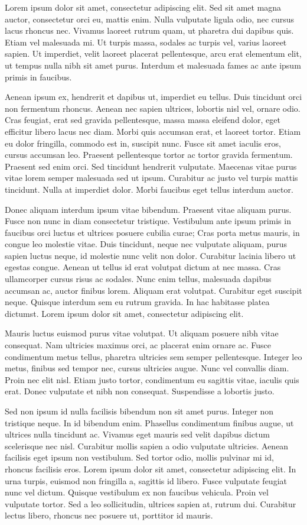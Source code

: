 Lorem ipsum dolor sit amet, consectetur adipiscing elit. Sed sit amet magna auctor, consectetur orci eu, mattis enim. Nulla vulputate ligula odio, nec cursus lacus rhoncus nec. Vivamus laoreet rutrum quam, ut pharetra dui dapibus quis. Etiam vel malesuada mi. Ut turpis massa, sodales ac turpis vel, varius laoreet sapien. Ut imperdiet, velit laoreet placerat pellentesque, arcu erat elementum elit, ut tempus nulla nibh sit amet purus. Interdum et malesuada fames ac ante ipsum primis in faucibus.

Aenean ipsum ex, hendrerit et dapibus ut, imperdiet eu tellus. Duis tincidunt orci non fermentum rhoncus. Aenean nec sapien ultrices, lobortis nisl vel, ornare odio. Cras feugiat, erat sed gravida pellentesque, massa massa eleifend dolor, eget efficitur libero lacus nec diam. Morbi quis accumsan erat, et laoreet tortor. Etiam eu dolor fringilla, commodo est in, suscipit nunc. Fusce sit amet iaculis eros, cursus accumsan leo. Praesent pellentesque tortor ac tortor gravida fermentum. Praesent sed enim orci. Sed tincidunt hendrerit vulputate. Maecenas vitae purus vitae lorem semper malesuada sed ut ipsum. Curabitur ac justo vel turpis mattis tincidunt. Nulla at imperdiet dolor. Morbi faucibus eget tellus interdum auctor.

Donec aliquam interdum ipsum vitae bibendum. Praesent vitae aliquam purus. Fusce non nunc in diam consectetur tristique. Vestibulum ante ipsum primis in faucibus orci luctus et ultrices posuere cubilia curae; Cras porta metus mauris, in congue leo molestie vitae. Duis tincidunt, neque nec vulputate aliquam, purus sapien luctus neque, id molestie nunc velit non dolor. Curabitur lacinia libero ut egestas congue. Aenean ut tellus id erat volutpat dictum at nec massa. Cras ullamcorper cursus risus ac sodales. Nunc enim tellus, malesuada dapibus accumsan ac, auctor finibus lorem. Aliquam erat volutpat. Curabitur eget suscipit neque. Quisque interdum sem eu rutrum gravida. In hac habitasse platea dictumst. Lorem ipsum dolor sit amet, consectetur adipiscing elit.

Mauris luctus euismod purus vitae volutpat. Ut aliquam posuere nibh vitae consequat. Nam ultricies maximus orci, ac placerat enim ornare ac. Fusce condimentum metus tellus, pharetra ultricies sem semper pellentesque. Integer leo metus, finibus sed tempor nec, cursus ultricies augue. Nunc vel convallis diam. Proin nec elit nisl. Etiam justo tortor, condimentum eu sagittis vitae, iaculis quis erat. Donec vulputate et nibh non consequat. Suspendisse a lobortis justo.

Sed non ipsum id nulla facilisis bibendum non sit amet purus. Integer non tristique neque. In id bibendum enim. Phasellus condimentum finibus augue, ut ultrices nulla tincidunt ac. Vivamus eget mauris sed velit dapibus dictum scelerisque nec nisl. Curabitur mollis sapien a odio vulputate ultricies. Aenean facilisis eget ipsum non vestibulum. Sed tortor odio, mollis pulvinar mi id, rhoncus facilisis eros. Lorem ipsum dolor sit amet, consectetur adipiscing elit. In urna turpis, euismod non fringilla a, sagittis id libero. Fusce vulputate feugiat nunc vel dictum. Quisque vestibulum ex non faucibus vehicula. Proin vel vulputate tortor. Sed a leo sollicitudin, ultrices sapien at, rutrum dui. Curabitur lectus libero, rhoncus nec posuere ut, porttitor id mauris.